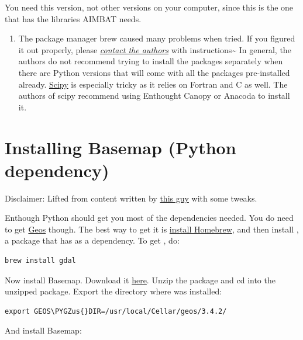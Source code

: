\documentclass[letterpaper,10pt,english]{sphinxmanual}
\def\PYGZus{\char`\_}
\begin{document}
You need this version, not other versions on your computer, since this is the one that has the libraries AIMBAT needs.
\begin{enumerate}
\item {} 
The package manager brew caused many problems when tried. If you figured it out properly, please {\hyperref[docfiles/introduction:authors-contacts]{\emph{contact the authors}}} with instructions\textasciitilde{} In general, the authors do not recommend trying to install the packages separately when there are Python versions that will come with all the packages pre-installed already. \href{http://www.scipy.org/install.html}{Scipy} is especially tricky as it relies on Fortran and C as well. The authors of scipy recommend using Enthought Canopy or Anacoda to install it.

\end{enumerate}


\section{Installing Basemap (Python dependency)}
\label{docfiles/install_dependencies:installing-basemap-python-dependency}
Disclaimer: Lifted from content written by \href{http://blog.bluedackers.com/2012/11/13/installing-basemap-on-mac-os-x-mountain-lion/}{this guy} with some tweaks.

Enthough Python should get you most of the dependencies needed. You do need to get \href{http://trac.osgeo.org/geos/}{Geos} though. The best way to get it is \href{http://matthewcarriere.com/2013/08/05/how-to-install-and-use-homebrew/}{install Homebrew}, and then install , a package that has  as a dependency. To get , do:

\begin{Verbatim}[commandchars=\\\{\}]
brew install gdal
\end{Verbatim}

Now install Basemap. Download it \href{http://sourceforge.net/projects/matplotlib/files/matplotlib-toolkits/}{here}. Unzip the package and cd into the unzipped package. Export the directory where  was installed:

\begin{Verbatim}[commandchars=\\\{\}]
export GEOS\PYGZus{}DIR=/usr/local/Cellar/geos/3.4.2/
\end{Verbatim}

And install Basemap:
\end{document}
